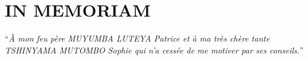 \chapter*{IN MEMORIAM}
    \enquote{\it À mon feu père MUYUMBA LUTEYA Patrice et à ma très
    chère tante  TSHINYAMA MUTOMBO Sophie qui n’a cessée
    de me motiver par ses conseils.}
